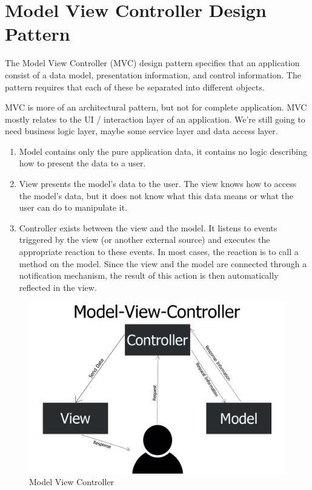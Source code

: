 \section{Model View Controller Design Pattern}

The Model View Controller (MVC) design pattern specifies that an application consist of a data model, presentation information, and control information. The pattern requires that each of these be separated into different objects.

MVC is more of an architectural pattern, but not for complete application. MVC mostly relates to the UI / interaction layer of an application. We’re still going to need business logic layer, maybe some service layer and data access layer.



\begin{enumerate}
    \item Model contains only the pure application data, it contains no logic describing how to present the data to a user.
    \item View presents the model’s data to the user. The view knows how to access the model’s data, but it does not know what this data means or what the user can do to manipulate it.
    \item Controller exists between the view and the model. It listens to events triggered by the view (or another external source) and executes the appropriate reaction to these events. In most cases, the reaction is to call a method on the model. Since the view and the model are connected through a notification mechanism, the result of this action is then automatically reflected in the view.
\end{enumerate}

\begin{figure}[!ht]
    \center
    \includegraphics[scale=0.30]{assets/mvc.jpg}
    \caption{Model View Controller}
    \label{fig:mvc}
\end{figure}

